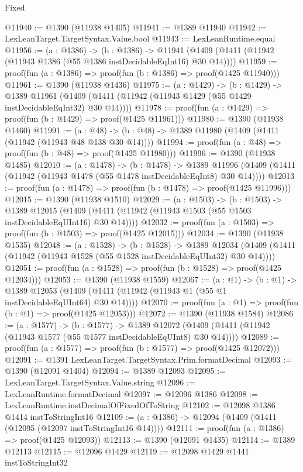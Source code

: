 \begin{lexlean}{Fixed}
\begin{coremodule}
@11940 := @1390 (@11938 @1405)
@11941 := @1389 @11940
@11942 := LexLeanTarget.TargetSyntax.Value.bool
@11943 := LexLeanRuntime.equal
@11956 := (a : @1386) ->
  (b : @1386) ->
  @11941 (@1409 (@1411 (@11942 (@11943 @1386 (@55 @1386 instDecidableEqInt16) @30 @14))))
@11959 := proof(fun (a : @1386) => proof(fun (b : @1386) => proof(@1425 @11940)))
@11961 := @1390 (@11938 @1436)
@11975 := (a : @1429) ->
  (b : @1429) ->
  @1389 @11961 (@1409 (@1411 (@11942 (@11943 @1429 (@55 @1429 instDecidableEqInt32) @30 @14))))
@11978 := proof(fun (a : @1429) => proof(fun (b : @1429) => proof(@1425 @11961)))
@11980 := @1390 (@11938 @1460)
@11991 := (a : @48) -> (b : @48) -> @1389 @11980 (@1409 (@1411 (@11942 (@11943 @48 @138 @30 @14))))
@11994 := proof(fun (a : @48) => proof(fun (b : @48) => proof(@1425 @11980)))
@11996 := @1390 (@11938 @1485)
@12010 := (a : @1478) ->
  (b : @1478) ->
  @1389 @11996 (@1409 (@1411 (@11942 (@11943 @1478 (@55 @1478 instDecidableEqInt8) @30 @14))))
@12013 := proof(fun (a : @1478) => proof(fun (b : @1478) => proof(@1425 @11996)))
@12015 := @1390 (@11938 @1510)
@12029 := (a : @1503) ->
  (b : @1503) ->
  @1389 @12015 (@1409 (@1411 (@11942 (@11943 @1503 (@55 @1503 instDecidableEqUInt16) @30 @14))))
@12032 := proof(fun (a : @1503) => proof(fun (b : @1503) => proof(@1425 @12015)))
@12034 := @1390 (@11938 @1535)
@12048 := (a : @1528) ->
  (b : @1528) ->
  @1389 @12034 (@1409 (@1411 (@11942 (@11943 @1528 (@55 @1528 instDecidableEqUInt32) @30 @14))))
@12051 := proof(fun (a : @1528) => proof(fun (b : @1528) => proof(@1425 @12034)))
@12053 := @1390 (@11938 @1559)
@12067 := (a : @1) ->
  (b : @1) ->
  @1389 @12053 (@1409 (@1411 (@11942 (@11943 @1 (@55 @1 instDecidableEqUInt64) @30 @14))))
@12070 := proof(fun (a : @1) => proof(fun (b : @1) => proof(@1425 @12053)))
@12072 := @1390 (@11938 @1584)
@12086 := (a : @1577) ->
  (b : @1577) ->
  @1389 @12072 (@1409 (@1411 (@11942 (@11943 @1577 (@55 @1577 instDecidableEqUInt8) @30 @14))))
@12089 := proof(fun (a : @1577) => proof(fun (b : @1577) => proof(@1425 @12072)))
@12091 := @1391 LexLeanTarget.TargetSyntax.Prim.formatDecimal
@12093 := @1390 (@12091 @1404)
@12094 := @1389 @12093
@12095 := LexLeanTarget.TargetSyntax.Value.string
@12096 := LexLeanRuntime.formatDecimal
@12097 := @12096 @1386
@12098 := LexLeanRuntime.instDecimalOfFixedOfToString
@12102 := @12098 @1386 @1414 instToStringInt16
@12109 := (a : @1386) -> @12094 (@1409 (@1411 (@12095 (@12097 instToStringInt16 @14))))
@12111 := proof(fun (a : @1386) => proof(@1425 @12093))
@12113 := @1390 (@12091 @1435)
@12114 := @1389 @12113
@12115 := @12096 @1429
@12119 := @12098 @1429 @1441 instToStringInt32

\end{coremodule}
\end{lexlean}
